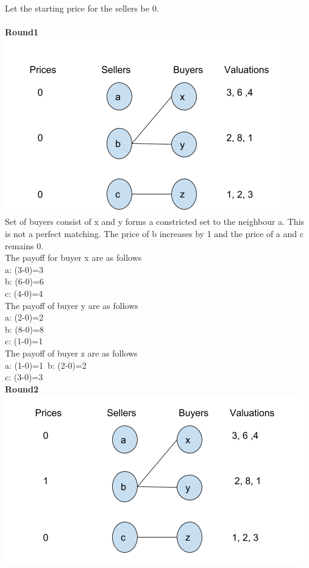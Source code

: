 \documentclass[]{article}
\begin{document}
Let the starting price for the sellers be 0.\\\\
\textbf{Round1}\\
\includegraphics[scale=.5]{9r1.png}\\
Set of buyers consist of x and y forms a constricted set to the neighbour a. This is not a perfect matching. The price of b increases by 1 and the price of a and c remains 0.\\
The payoff for buyer x are as follows \\
a: (3-0)=3\\
b: (6-0)=6\\
c: (4-0)=4\\
The payoff of buyer y are as follows\\
a: (2-0)=2\\
b: (8-0)=8\\
c: (1-0)=1\\
The payoff of buyer z are as follows\\
a: (1-0)=1\
b: (2-0)=2\\
c: (3-0)=3\\
\newpage
\textbf{Round2}\\
\includegraphics[scale=.5]{9r2.png}\\
\end{document}
